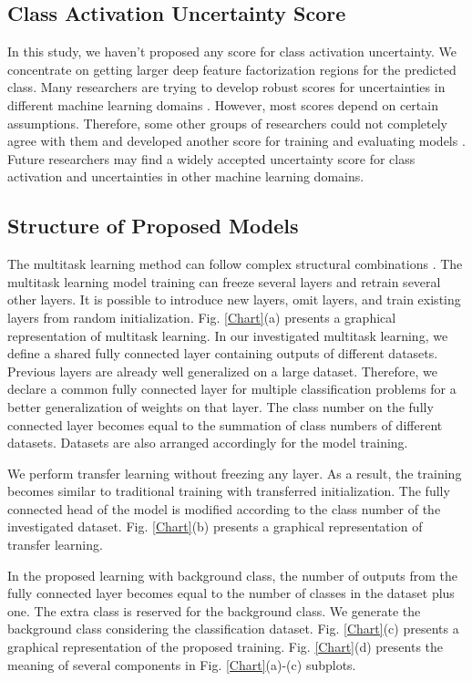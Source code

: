 \documentclass{article}
\begin{document}
\subsection{Class Activation Uncertainty Score}
In this study, we haven't proposed any score for class activation uncertainty. We concentrate on getting larger deep feature factorization regions for the predicted class. Many researchers are trying to develop robust scores for uncertainties in different machine learning domains \cite{marin2016prediction, kendall2018multi}. However, most scores depend on certain assumptions. Therefore, some other groups of researchers could not completely agree with them and developed another score for training and evaluating models \cite{pearce2018high, kabir2021optimal}. Future researchers may find a widely accepted uncertainty score for class activation and uncertainties in other machine learning domains.

\subsection{Structure of Proposed Models}
The multitask learning method can follow complex structural combinations \cite{gesmundo2022evolutionary}. The multitask learning model training can freeze several layers and retrain several other layers. It is possible to introduce new layers, omit layers, and train existing layers from random initialization. Fig. \ref{Chart}(a) presents a graphical representation of multitask learning. In our investigated multitask learning, we define a shared fully connected layer containing outputs of different datasets. Previous layers are already well generalized on a large dataset.  Therefore, we declare a common fully connected layer for multiple classification problems for a better generalization of weights on that layer.
The class number on the fully connected layer becomes equal to the summation of class numbers of different datasets. Datasets are also arranged accordingly for the model training.

We perform transfer learning without freezing any layer. As a result, the training becomes similar to traditional training with transferred initialization. The fully connected head of the model is modified according to the class number of the investigated dataset. Fig. \ref{Chart}(b) presents a graphical representation of transfer learning.

In the proposed learning with background class, the number of outputs from the fully connected layer becomes equal to the number of classes in the dataset plus one. The extra class is reserved for the background class. We generate the background class considering the classification dataset. Fig. \ref{Chart}(c) presents a graphical representation of the proposed training. Fig. \ref{Chart}(d) presents the meaning of several components in Fig. \ref{Chart}(a)-(c) subplots.
\end{document}
